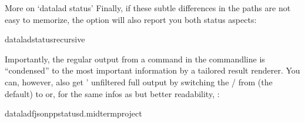 \begin{findoutmore}[label={fom-status}, before title={\thetcbcounter\ }, float, check odd page=true]{More on ‘datalad status’}
\sphinxAtStartPar
Finally, if these subtle differences in the paths are not easy to memorize,
the  option will also report you both status aspects:

\begin{sphinxVerbatim}[commandchars=\\\{\}]
dataladstatus\PYGZhy{}\PYGZhy{}recursive
\end{sphinxVerbatim}

\sphinxAtStartPar
Importantly, the regular output from a  command in the commandline is “condensed” to the most important information by a tailored result renderer.
You can, however, also get ’ unfiltered full output by switching the / from  (the default) to  or, for the same infos as  but better readability, :

\begin{sphinxVerbatim}[commandchars=\\\{\}]
datalad\PYGZhy{}fjson\PYGZus{}ppstatus\PYGZhy{}d.midterm\PYGZus{}project
\end{sphinxVerbatim}


\end{findoutmore}
